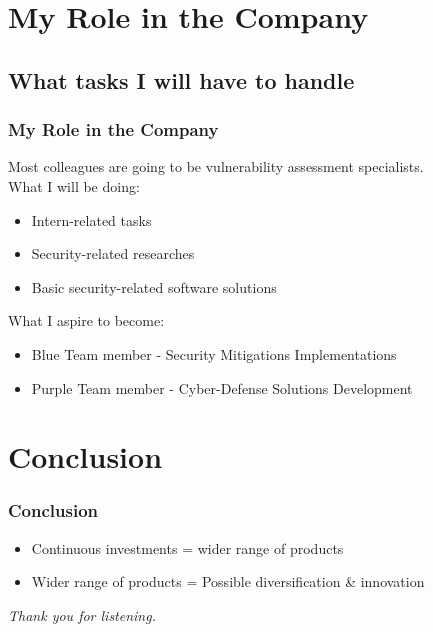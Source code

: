 \documentclass{beamer}
\begin{document}
	\section{My Role in the Company}
	\subsection{What tasks I will have to handle}
	\begin{frame}
		\frametitle{My Role in the Company}
		Most colleagues are going to be vulnerability assessment specialists.\\
		What I will be doing:
		\begin{itemize}
			\item Intern-related tasks
			\item Security-related researches
			\item Basic security-related software solutions
		\end{itemize}
		What I aspire to become:
		\begin{itemize}
			\item Blue Team member - Security Mitigations Implementations
			\item Purple Team member - Cyber-Defense Solutions Development
		\end{itemize}
	\end{frame}
	\section{Conclusion}
	\begin{frame}
		\frametitle{Conclusion}
		\begin{itemize}
			\item Continuous investments = wider range of products
			\item Wider range of products = Possible diversification \& innovation
		\end{itemize}
	\end{frame}
	\begin{frame}
		\centering
		\Huge
		\emph{Thank you for listening.}
	\end{frame}
\end{document}
